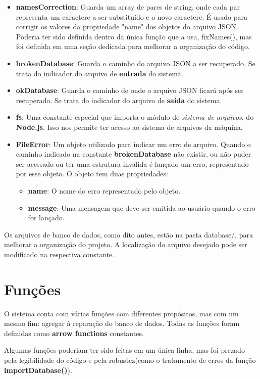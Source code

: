 \documentclass[12pt]{article}
\begin{document}
\begin{itemize}
    \item \textbf{namesCorrection}: Guarda um array de pares de string, onde cada par representa um caractere a ser substituído e o novo caractere. É usado para corrigir os valores da propriedade "name" dos objetos do arquivo JSON. Poderia ter sido definida dentro da única função que a usa, fixNames(), mas foi definida em uma seção dedicada para melhorar a organização do código. 
    \item \textbf{brokenDatabase}: Guarda o caminho do arquivo JSON a ser recuperado. Se trata do indicador do arquivo de \textbf{entrada} do sistema.
    \item \textbf{okDatabase}: Guarda o caminho de onde o arquivo JSON ficará após ser recuperado. Se trata do indicador do arquivo de \textbf{saída} do sistema.
    \item \textbf{fs}: Uma constante especial que importa o módulo de \textit{sistema de arquivos}, do \textbf{Node.js}. Isso nos permite ter acesso ao sistema de arquivos da máquina.
    \item \textbf{FileError}: Um objeto utilizado para indicar um erro de arquivo. Quando o caminho indicado na constante \textbf{brokenDatabase} não existir, ou não puder ser acessado ou ter uma estrutura inválida é lançado um erro, representado por esse objeto. O objeto tem duas propriedades:
    \begin{itemize}
        \item \textbf{name}: O nome do erro representado pelo objeto.
        \item \textbf{message}: Uma mensagem que deve ser emitida ao usuário quando o erro for lançado.
    \end{itemize}
\end{itemize}

Os arquivos de banco de dados, como dito antes, estão na pasta database/, para melhorar a organização do projeto. A localização do arquivo desejado pode ser modificado na respectiva constante.

\section{Funções}

O sistema conta com várias funções com diferentes propósitos, mas com um mesmo fim: agregar à reparação do banco de dados. Todas as funções foram definidas como \textbf{arrow functions} constantes.

Algumas funções poderiam ter sido feitas em um única linha, mas foi prezado pela legibilidade do código e pela robustez(como o tratamento de erros da função \textbf{importDatabase()}).
\end{document}
